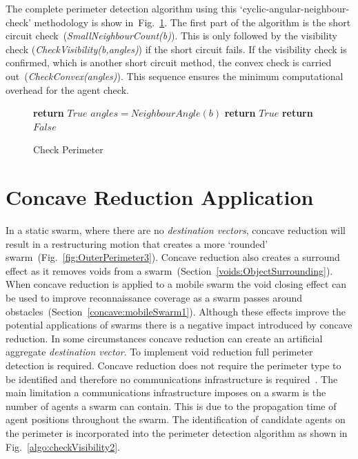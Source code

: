 \documentclass{ieeeaccess}
\begin{document}
The complete perimeter detection algorithm using this `cyclic-angular-neighbour-check' methodology is show in~Fig.~\ref{algo:CheckPerimeter}. The first part of the algorithm is the short circuit check~(\textit{SmallNeighbourCount(b)}). This is only followed by the visibility check (\textit{CheckVisibility(b,angles)}) if the short circuit fails. If the visibility check is confirmed, which is another short circuit method, the convex check is carried out~(\textit{CheckConvex(angles)}). This sequence ensures the minimum computational overhead for the agent check. 

\begin{figure}
\begin{algorithmic}[1]
{}
\State\textbf{return} $True$
\EndIf
\State$angles = NeighbourAngle(b)$
\State\textbf{return} $True$
\EndIf
\EndIf
\State\textbf{return} $False$
\EndProcedure
\end{algorithmic}
\caption{Check Perimeter}
\label{algo:CheckPerimeter}
\end{figure}

\section{Concave Reduction Application}\label{sec:ConcaveReductionApplication}
In a static swarm, where there are no \textit{destination vectors}, concave reduction will result in a restructuring motion that creates a more `rounded' swarm~(Fig.~\ref{fig:OuterPerimeter3}). Concave reduction also creates a surround effect as it removes voids from a swarm~(Section~\ref{voids:ObjectSurrounding}). When concave reduction is applied to a mobile swarm the void closing effect can be used to improve reconnaissance coverage as a swarm passes around obstacles~(Section~\ref{concave:mobileSwarm1}).
Although these effects improve the potential applications of swarms there is a negative impact introduced by concave reduction. In some circumstances concave reduction can create an artificial aggregate \textit{destination vector}. 
To implement void reduction full perimeter detection is required. Concave reduction does not require the perimeter type to be identified and therefore no communications infrastructure is required~\cite{MD:09,NIM:09,SOM:12,ZFG:13,JG:13}. The main limitation a communications infrastructure imposes on a swarm is the number of agents a swarm can contain. This is due to the propagation time of agent positions throughout the swarm. 
The identification of candidate agents on the perimeter is incorporated into the perimeter detection algorithm as shown in Fig.~\ref{algo:checkVisibility2}.\\
\end{document}
